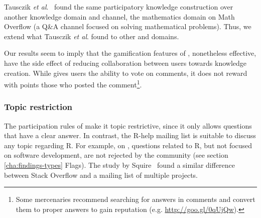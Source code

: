     Tausczik \textit{et al}.~\cite{Tausczik2014} found the same participatory knowledge construction over another knowledge domain and channel, the mathematics domain on Math Overflow (a Q\&A channel focused on solving mathematical problems).
    Thus, we extend what Tausczik \textit{et al}. found to other \channels and domains.

    Our results seem to imply that the gamification features of \SO, nonetheless effective, have the side effect of reducing collaboration between users towards knowledge creation.
    While \SO gives users the ability to vote on comments, it does not reward with points those who posted the comment\footnote{Some \SO \textsf{mercenaries}
      recommend searching for answers in comments and convert them to proper answers to gain reputation (e.g. \url{http://goo.gl/0qUjQw}).}.


\subsubsection{Topic restriction}

The participation rules of \SO make it topic restrictive, since it only allows questions that have a clear answer. In contrast, the R-help mailing list is suitable to discuss
any topic regarding R. For example, on \RH, questions related to R, but not focused on software development, are not rejected by the community (see section
\ref{cha:findings-types} Flags).
The study by Squire~\cite{Squire2015a} found a similar difference between Stack Overflow and a mailing list of multiple projects.

